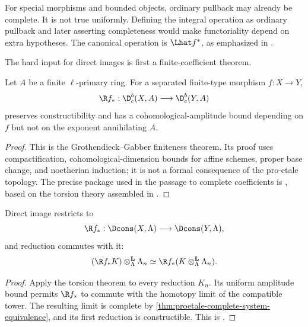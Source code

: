 \begin{warning}
For special morphisms and bounded objects, ordinary pullback may already be
complete.  It is not true uniformly.  Defining the integral operation as
ordinary pullback and later asserting completeness would make functoriality
depend on extra hypotheses.  The canonical operation is
\(\Lhat f^*\), as emphasized in
\cite[Remark~6.5.10]{BhattScholzeProEtale}.
\end{warning}

The hard input for direct images is first a finite-coefficient theorem.

\begin{theorem}
\label{thm:torsion-finiteness-input}
Let \(A\) be a finite \(\ell\)-primary ring.  For a separated finite-type
morphism \(f:X\to Y\),
\[
 \R f_*:\D^b_c(X,A)\longrightarrow\D^b_c(Y,A)
\]
preserves constructibility and has a cohomological-amplitude bound depending
on \(f\) but not on the exponent annihilating \(A\).
\end{theorem}

\begin{proof}
This is the Grothendieck--Gabber finiteness theorem.  Its proof uses
compactification, cohomological-dimension bounds for affine schemes, proper
base change, and noetherian induction; it is not a formal consequence of the
pro-etale topology.  The precise package used in the passage to complete
coefficients is \cite[Theorem~6.7.1]{BhattScholzeProEtale}, based on the
torsion theory assembled in \cite{SGA4,SGA4half,ILOTravauxGabber}.
\end{proof}

\begin{corollary}
\label{cor:integral-direct-image}
Direct image restricts to
\[
 \R f_*:\Dcons(X,\Lambda)\longrightarrow\Dcons(Y,\Lambda),
\]
and reduction commutes with it:
\[
 ( \R f_*K)\otimes^{\mathbf L}_{\Lambda}\Lambda_n
   \simeq
 \R f_*(K\otimes^{\mathbf L}_{\Lambda}\Lambda_n).
\]
\end{corollary}

\begin{proof}
Apply the torsion theorem to every reduction \(K_n\).  Its uniform amplitude
bound permits \(\R f_*\) to commute with the homotopy limit of the compatible
tower.  The resulting limit is complete by
\cref{thm:proetale-complete-system-equivalence}, and its first reduction is
constructible.  This is \cite[Lemma~6.7.2]{BhattScholzeProEtale}.
\end{proof}

